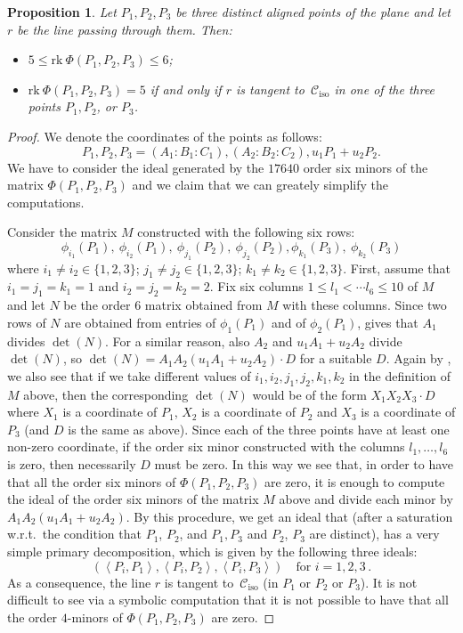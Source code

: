 \documentclass[11pt, a4paper, reqno, captions=tableheading,bibliography=totoc]{scrartcl}
\theoremstyle{plain}
\newtheorem{prop}[lemma]{Proposition}
\theoremstyle{definition}
\newcommand{\iso}{\mathcal{C}_{\mathrm{iso}}}
\newcommand{\scl}[2]{\left\langle {#1}, {#2} \right\rangle}
\newcommand{\rk}{\ensuremath{\mathrm{rk}}}
\begin{document}
\begin{prop}
\label{proposition:three_aligned_ranks}
Let $P_1, P_2, P_3$ be three distinct aligned points of the plane and let
$r$ be the line passing through them. Then:
\begin{itemize}
\item $5 \leq \rk \ \Phi(P_1, P_2, P_3) \leq 6$;
\item
$\rk \ \Phi(P_1, P_2, P_3) = 5$ if and only if $r$ is tangent
to~$\iso$ in one of the three points $P_1, P_2$, or $P_3$.
\end{itemize}
\end{prop}
\begin{proof} We denote the coordinates of the points as follows:
\[
P_1, P_2, P_3 = (A_1: B_1: C_1), (A_2: B_2: C_2), u_1P_1+u_2P_2.
\]
We have to consider the ideal generated by the $17640$ order six
minors of the matrix $\Phi(P_1, P_2, P_3)$ and we
claim that we can greately simplify
the computations.

Consider the matrix $M$ constructed with the following six rows:
\[
\phi_{i_1}(P_1), \ \phi_{i_2}(P_1), \ \phi_{j_1}(P_2),\  \phi_{j_2}(P_2),
\phi_{k_1}(P_3), \ \phi_{k_2}(P_3)
\]
where $i_1 \not= i_2 \in \{1, 2, 3\}$; $j_1 \not= j_2 \in \{1, 2, 3\}$;
$k_1 \not= k_2 \in \{1, 2, 3\}$.
First, assume that $i_1=j_1=k_1=1$ and
$i_2=j_2=k_2=2$. Fix six columns
$1\leq l_1 < \cdots l_6 \leq 10$ of $M$ and let $N$ be the order $6$ matrix
obtained from $M$ with these columns. Since two rows of $N$ are obtained from
entries of $\phi_1(P_1)$ and of $\phi_2(P_1)$,
 gives that $A_1$ divides $\det(N)$. For a similar
reason, also $A_2$ and $u_1A_1+u_2A_2$ divide $\det(N)$, so
$\det(N) = A_1A_2(u_1A_1+u_2A_2)\cdot D$ for a suitable $D$.
Again by , we also see that if we take different values of
$i_1, i_2, j_1, j_2, k_1, k_2$ in the definition of $M$ above, then
the corresponding $\det(N)$ would be of the form $X_1X_2X_3\cdot D$ where
$X_1$ is a coordinate of $P_1$, $X_2$ is a coordinate of $P_2$ and $X_3$ is
a coordinate of $P_3$ (and $D$ is the same as above). Since each of the three
points have at least one non-zero coordinate, if the order six minor
constructed with the columns $l_1, \dots, l_6$ is zero, then necessarily $D$
must be zero. In this way we see that, in order to have that all the order
six minors of $\Phi(P_1, P_2, P_3)$ are zero, it is enough to compute the
ideal of the order six minors of the matrix $M$ above and divide each
minor by $A_1A_2(u_1A_1+u_2A_2)$. By this procedure, we get an ideal that (after
a saturation w.r.t.\ the condition that $P_1$, $P_2$, and $P_1, P_3$ and
$P_2$, $P_3$ are distinct), has
a very simple primary decomposition, which is given by the following three
ideals:
\[
\left(\scl{P_i}{P_1}, \scl{P_i}{P_2},\scl{P_i}{P_3}\right) \quad
\mbox{for } i = 1, 2, 3 \,.
\]
As a consequence, the line $r$ is tangent to~$\iso$
(in $P_1$ or $P_2$ or $P_3$).
It is not difficult to see via a symbolic computation that it is not possible to have that all the order
$4$-minors of $\Phi(P_1, P_2, P_3)$ are zero.
\end{proof}
\end{document}
